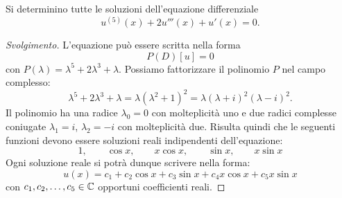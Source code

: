 \begin{example}
Si determinino tutte le soluzioni dell'equazione differenziale
\[
  u^{(5)}(x) + 2 u'''(x) + u'(x) = 0.
\]
\end{example}
%
\begin{proof}[Svolgimento]
L'equazione può essere scritta nella forma
\[
  P(D) [u] = 0
\]
con $P(\lambda) = \lambda^5 + 2 \lambda^3+\lambda$. 
Possiamo fattorizzare il polinomio $P$ nel campo complesso:
\[
\lambda^5 + 2\lambda^3 +\lambda = \lambda(\lambda^2+1)^2 = \lambda (\lambda+i)^2(\lambda-i)^2.
\]
Il polinomio ha una radice $\lambda_0=0$ con molteplicità uno e due radici complesse coniugate 
$\lambda_1 = i$, $\lambda_2=-i$ con molteplicità due.
Risulta quindi che le seguenti funzioni devono essere soluzioni reali indipendenti dell'equazione:
\begin{equation}\label{eq:4995566}
 1, \qquad
 \cos x, \qquad
 x \cos x, \qquad
 \sin x, \qquad
 x \sin x
\end{equation}
Ogni soluzione reale si potrà dunque scrivere nella forma:
\begin{equation}\label{eq:499355456}
  u(x) = c_1 + c_2 \cos x + c_3 \sin x + c_4 x \cos x + c_5 x \sin x
\end{equation}
con $c_1, c_2, \dots, c_5 \in {\mathbb C}$ opportuni coefficienti reali.
\end{proof}

